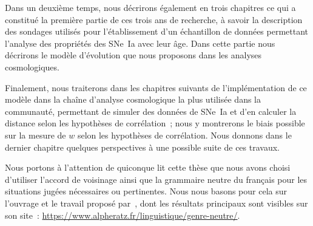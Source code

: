 \documentclass[../main/main.tex]{subfiles}
\begin{document}
Dans un deuxième temps, nous décrirons également en trois chapitres ce qui a
constitué la première partie de ces trois ans de recherche, à savoir la
description des sondages utilisés pour l'établissement d'un échantillon de
données permettant l'analyse des propriétés des SNe~Ia avec leur âge. Dans cette
partie nous décrirons le modèle d'évolution que nous proposons dans les analyses
cosmologiques.

Finalement, nous traiterons dans les chapitres suivants de l'implémentation de
ce modèle dans la chaîne d'analyse cosmologique la plus utilisée dans la
communauté, permettant de simuler des données de SNe~Ia et d'en calculer la
distance selon les hypothèses de corrélation~; nous y montrerons le biais
possible sur la mesure de $w$ selon les hypothèses de corrélation. Nous donnons
dans le dernier chapitre quelques perspectives à une possible suite de ces
travaux.

\vfill

Nous portons à l'attention de quiconque lit cette thèse que nous avons choisi
d'utiliser l'accord de voisinage ainsi que la grammaire neutre du français pour
les situations jugées nécessaires ou pertinentes. Nous nous basons pour cela sur
l'ouvrage et le travail proposé par~\cite{alpheratz2018}, dont les résultats
principaux sont visibles sur son site~:
\href{https://www.alpheratz.fr/linguistique/genre-neutre/}
{https://www.alpheratz.fr/linguistique/genre-neutre/}.

\vfill

% 
% 
\end{document}
